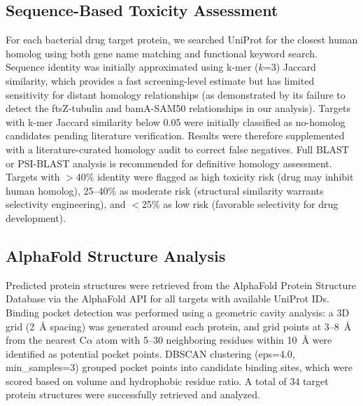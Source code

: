 \documentclass[12pt,a4paper]{article}
\begin{document}
\subsection{Sequence-Based Toxicity Assessment}
For each bacterial drug target protein, we searched UniProt for the closest human homolog using both gene name matching and functional keyword search. Sequence identity was initially approximated using k-mer ($k$=3) Jaccard similarity, which provides a fast screening-level estimate but has limited sensitivity for distant homology relationships (as demonstrated by its failure to detect the ftsZ-tubulin and bamA-SAM50 relationships in our analysis). Targets with k-mer Jaccard similarity below 0.05 were initially classified as no-homolog candidates pending literature verification. Results were therefore supplemented with a literature-curated homology audit to correct false negatives. Full BLAST or PSI-BLAST analysis is recommended for definitive homology assessment. Targets with $>$40\% identity were flagged as high toxicity risk (drug may inhibit human homolog), 25--40\% as moderate risk (structural similarity warrants selectivity engineering), and $<$25\% as low risk (favorable selectivity for drug development).

\subsection{AlphaFold Structure Analysis}
Predicted protein structures were retrieved from the AlphaFold Protein Structure Database \citep{jumper2021} via the AlphaFold API for all targets with available UniProt IDs. Binding pocket detection was performed using a geometric cavity analysis: a 3D grid (2~\AA{} spacing) was generated around each protein, and grid points at 3--8~\AA{} from the nearest C$\alpha$ atom with 5--30 neighboring residues within 10~\AA{} were identified as potential pocket points. DBSCAN clustering (eps=4.0, min\_samples=3) grouped pocket points into candidate binding sites, which were scored based on volume and hydrophobic residue ratio. A total of 34 target protein structures were successfully retrieved and analyzed.
\end{document}
